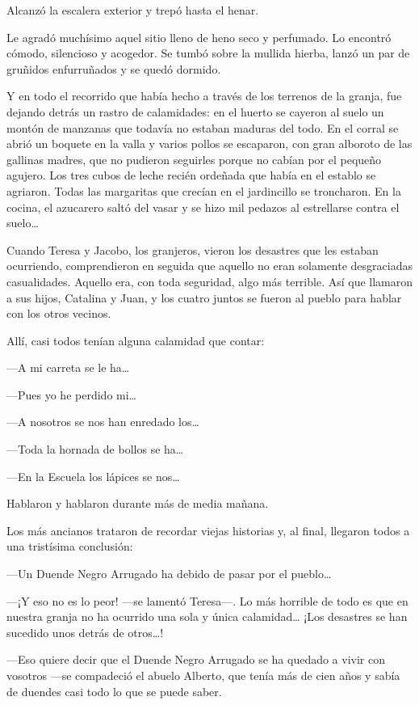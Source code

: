 \documentclass{barcodevapor3pags}
\begin{document}
Alcanzó la escalera exterior y trepó hasta el henar.

Le agradó muchísimo aquel sitio lleno de heno seco y perfumado. Lo
encontró cómodo, silencioso y acogedor. Se tumbó sobre la mullida
hierba, lanzó un par de gruñidos enfurruñados y se quedó dormido.

Y en todo el recorrido que había hecho a través de los terrenos de la
granja, fue dejando detrás un rastro de calamidades: en el huerto se
cayeron al suelo un montón de manzanas que todavía no estaban maduras
del todo. En el corral se abrió un boquete en la valla y varios pollos
se escaparon, con gran alboroto de las gallinas madres, que no pudieron
seguirles porque no cabían por el pequeño agujero. Los tres cubos de
leche recién ordeñada que había en el establo se agriaron. Todas las
margaritas que crecían en el jardincillo se troncharon. En la cocina, el
azucarero saltó del vasar y se hizo mil pedazos al estrellarse contra el
suelo\ldots{}

Cuando Teresa y Jacobo, los granjeros, vieron los desastres que les
estaban ocurriendo, comprendieron en seguida que aquello no eran
solamente desgraciadas casualidades. Aquello era, con toda seguridad,
algo más terrible. Así que llamaron a sus hijos, Catalina y Juan, y los
cuatro juntos se fueron al pueblo para hablar con los otros vecinos.

Allí, casi todos tenían alguna calamidad que contar:

---A mi carreta se le ha\ldots{}

---Pues yo he perdido mi\ldots{}

---A nosotros se nos han enredado los\ldots{}

---Toda la hornada de bollos se ha\ldots{}

---En la Escuela los lápices se nos\ldots{}

Hablaron y hablaron durante más de media mañana.

Los más ancianos trataron de recordar viejas historias y, al final,
llegaron todos a una tristísima conclusión:

---Un Duende Negro Arrugado ha debido de pasar por el pueblo\ldots{}

---¡Y eso no es lo peor! ---se lamentó Teresa---. Lo más horrible de
todo es que en nuestra granja no ha ocurrido una sola y única
calamidad\ldots{} ¡Los desastres se han sucedido unos detrás de
otros\ldots!

---Eso quiere decir que el Duende Negro Arrugado se ha quedado a vivir
con vosotros ---se compadeció el abuelo Alberto, que tenía más de cien
años y sabía de duendes casi todo lo que se puede saber.
\end{document}
